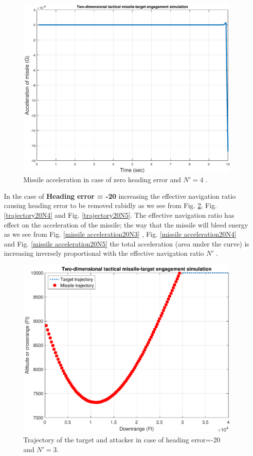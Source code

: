 \begin{figure}[htb]
	\centering
	\includegraphics[scale = 0.75]{fig/MissileAcceleration0N4.pdf}
	\caption{Missile acceleration in case of zero heading error and $N'=4$ .}
	\label{missile acceleration0N4}
\end{figure}


In the case of \textbf{Heading error = -20} increasing the effective navigation ratio causing heading error to be removed rabidly as we see from  Fig. \ref{trajectory20N3}, Fig. \ref{trajectory20N4} and Fig. \ref{trajectory20N5}. The effective navigation ratio has effect on the acceleration of the missile; the way that the missile will bleed energy as we see from Fig. \ref{missile acceleration20N3} , Fig. \ref{missile acceleration20N4} and Fig. \ref{missile acceleration20N5} the total acceleration (area under the curve) is increasing inversely proportional with the effective navigation ratio $N'$ .


\begin{figure}[htb]
	\centering
	\includegraphics[scale = 0.75]{fig/trajectory20N3.pdf}
	\caption{Trajectory of the target and attacker in case of heading error=-20 and $N'=3$.}
	\label{trajectory20N3}
\end{figure}

